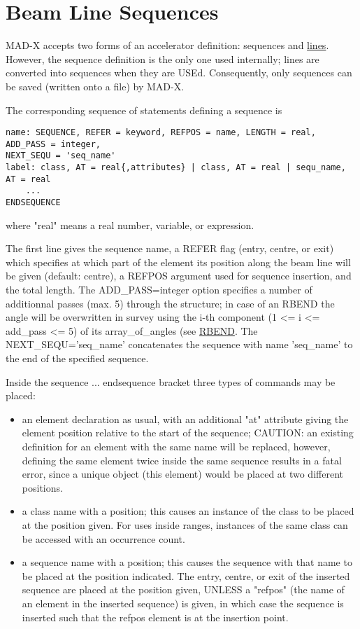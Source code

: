 
\chapter{Beam Line Sequences}
 
MAD-X accepts two forms of an accelerator definition: sequences and
\href{line.html}{lines}. However, the sequence definition is the only
one used internally; lines are converted into sequences when they are
USEd. Consequently, only sequences can be saved (written onto a file)
by MAD-X.  

The corresponding sequence of statements defining a sequence is 
\begin{verbatim}
name: SEQUENCE, REFER = keyword, REFPOS = name, LENGTH = real, ADD_PASS = integer,
NEXT_SEQU = 'seq_name'
label: class, AT = real{,attributes} | class, AT = real | sequ_name, AT = real
    ...
ENDSEQUENCE
\end{verbatim} 
where "real" means a real number, variable, or expression. 

The first line gives the sequence name, a REFER flag (entry, centre, or
exit) which specifies at which part of the element its position along
the beam line will be given (default: centre), a REFPOS argument used
for sequence insertion, and the total length. The ADD\_PASS=integer
option specifies a number of additionnal passes (max. 5) through the
structure; in case of an RBEND the angle will be overwritten in  survey
using the i-th component (1 \textless = i \textless = add\_pass
\textless= 5) of its array\_of\_angles (see \href{bend.html}{RBEND}. The
NEXT\_SEQU='seq\_name' concatenates the sequence with name 'seq\_name'
to the end of the specified sequence. 
 
Inside the sequence ... endsequence bracket three types of commands may
be placed:  
\begin{itemize}
   \item an element declaration as usual, with an additional "at"
     attribute giving the element position relative to the start of the
     sequence; CAUTION: an existing definition for an element with the
     same name will be replaced, however, defining the same element
     twice inside the same sequence results in a fatal error, since a
     unique object (this element) would be placed at two different
     positions. 
   \item a class name with a position; this causes an instance of the
     class to be placed at the position given. For uses inside ranges,
     instances of the same class can be accessed with an occurrence
     count. 
   \item a sequence name with a position; this causes the sequence with
     that name to be placed at the position indicated. The entry,
     centre, or exit of the inserted sequence are placed at the position
     given, UNLESS a "refpos" (the name of an element in the inserted
     sequence) is given, in which case the sequence is inserted such
     that the refpos element is  at the insertion point. 
\end{itemize} 

